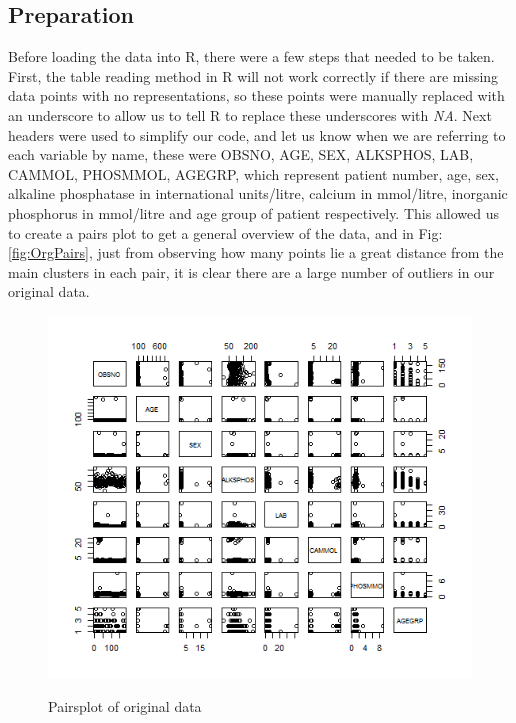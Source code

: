 \documentclass{article}
\begin{document}
    \subsection{Preparation}
    Before loading the data into R, there were a few steps that needed to be taken. First, the table reading method in R will not work correctly if there are missing data points with no representations, so these points were manually replaced with an underscore to allow us to tell R to replace these underscores with \textit{NA}. Next headers were used to simplify our code, and let us know when we are referring to each variable by name, these were OBSNO, AGE, SEX, ALKSPHOS, LAB, CAMMOL, PHOSMMOL, AGEGRP, which represent patient number, age, sex, alkaline phosphatase in international units/litre, calcium in mmol/litre, inorganic phosphorus in mmol/litre and age group of patient respectively.
      This allowed us to create a pairs plot to get a general overview of the data, and in Fig: \ref{fig:OrgPairs}, just from observing how many points lie a great distance from the main clusters in each pair, it is clear there are a large number of outliers in our original data.

      \begin{figure}
          \centering
          {\includegraphics[scale=0.6]{../results/FirstPairs.png}\label{fig:OrgPairs}}
          \caption{Pairsplot of original data}
          \label{fig:Pairs}
      \end{figure}
      
\end{document}
